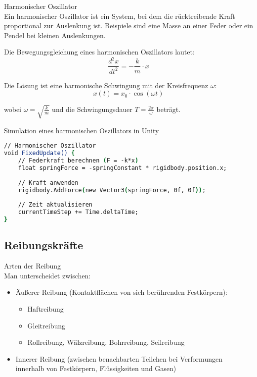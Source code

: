 \begin{concept}{Harmonischer Oszillator}\\
    Ein harmonischer Oszillator ist ein System, bei dem die rücktreibende Kraft proportional zur Auslenkung ist. Beispiele sind eine Masse an einer Feder oder ein Pendel bei kleinen Auslenkungen.
    
    Die Bewegungsgleichung eines harmonischen Oszillators lautet:
    \begin{equation}
        \frac{d^2 x}{dt^2} = -\frac{k}{m} \cdot x
    \end{equation}
    
    Die Lösung ist eine harmonische Schwingung mit der Kreisfrequenz $\omega$:
    \begin{equation}
        x(t) = x_0 \cdot \cos(\omega t)
    \end{equation}
    
    wobei $\omega = \sqrt{\frac{k}{m}}$ und die Schwingungsdauer $T = \frac{2\pi}{\omega}$ beträgt.
\end{concept}

\begin{examplecode}{Simulation eines harmonischen Oszillators in Unity}\\
    \begin{lstlisting}[language=csh, style=basesmol]
// Harmonischer Oszillator
void FixedUpdate() {
    // Federkraft berechnen (F = -k*x)
    float springForce = -springConstant * rigidbody.position.x;
    
    // Kraft anwenden
    rigidbody.AddForce(new Vector3(springForce, 0f, 0f));
    
    // Zeit aktualisieren
    currentTimeStep += Time.deltaTime;
}
    \end{lstlisting}
\end{examplecode}

\subsection{Reibungskräfte}
\begin{definition}{Arten der Reibung}\\
    Man unterscheidet zwischen:
    \begin{itemize}
        \item Äußerer Reibung (Kontaktflächen von sich berührenden Festkörpern):
        \begin{itemize}
            \item Haftreibung
            \item Gleitreibung
            \item Rollreibung, Wälzreibung, Bohrreibung, Seilreibung
        \end{itemize}
        \item Innerer Reibung (zwischen benachbarten Teilchen bei Verformungen innerhalb von Festkörpern, Flüssigkeiten und Gasen)
    \end{itemize}
\end{definition}

